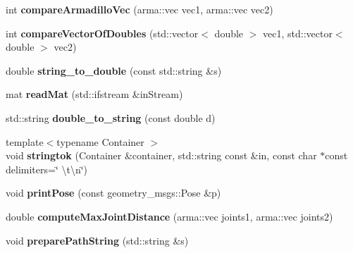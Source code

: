 \begin{DoxyCompactItemize}
\item 
\hypertarget{namespacekukadu_ac23d451b73ca627a0b9798b8f940ba22}{int {\bfseries compare\-Armadillo\-Vec} (arma\-::vec vec1, arma\-::vec vec2)}\label{namespacekukadu_ac23d451b73ca627a0b9798b8f940ba22}

\item 
\hypertarget{namespacekukadu_a20bd3cddb2a809db91032ee08336f7c1}{int {\bfseries compare\-Vector\-Of\-Doubles} (std\-::vector$<$ double $>$ vec1, std\-::vector$<$ double $>$ vec2)}\label{namespacekukadu_a20bd3cddb2a809db91032ee08336f7c1}

\item 
\hypertarget{namespacekukadu_a98d5b3b19d52db3ae4d0ec86544828c3}{double {\bfseries string\-\_\-to\-\_\-double} (const std\-::string \&s)}\label{namespacekukadu_a98d5b3b19d52db3ae4d0ec86544828c3}

\item 
\hypertarget{namespacekukadu_a098f6e18074cc91c0ce93dfa8b3c214c}{mat {\bfseries read\-Mat} (std\-::ifstream \&in\-Stream)}\label{namespacekukadu_a098f6e18074cc91c0ce93dfa8b3c214c}

\item 
\hypertarget{namespacekukadu_a96a0b0e4ddea21ce59c048facc488565}{std\-::string {\bfseries double\-\_\-to\-\_\-string} (const double d)}\label{namespacekukadu_a96a0b0e4ddea21ce59c048facc488565}

\item 
\hypertarget{namespacekukadu_adc0c3a0b9a1affd427c8585758459256}{{\footnotesize template$<$typename Container $>$ }\\void {\bfseries stringtok} (Container \&container, std\-::string const \&in, const char $\ast$const delimiters=\char`\"{} \textbackslash{}t\textbackslash{}n\char`\"{})}\label{namespacekukadu_adc0c3a0b9a1affd427c8585758459256}

\item 
\hypertarget{namespacekukadu_a3fb37a9c958c64d8f6b0159db10fd9a7}{void {\bfseries print\-Pose} (const geometry\-\_\-msgs\-::\-Pose \&p)}\label{namespacekukadu_a3fb37a9c958c64d8f6b0159db10fd9a7}

\item 
\hypertarget{namespacekukadu_a28a41c42826259bab68aed7975b56c83}{double {\bfseries compute\-Max\-Joint\-Distance} (arma\-::vec joints1, arma\-::vec joints2)}\label{namespacekukadu_a28a41c42826259bab68aed7975b56c83}

\item 
\hypertarget{namespacekukadu_a1a615b8c4aa3b3478ac8275cbcd15275}{void {\bfseries prepare\-Path\-String} (std\-::string \&s)}\label{namespacekukadu_a1a615b8c4aa3b3478ac8275cbcd15275}


\end{DoxyCompactItemize}
